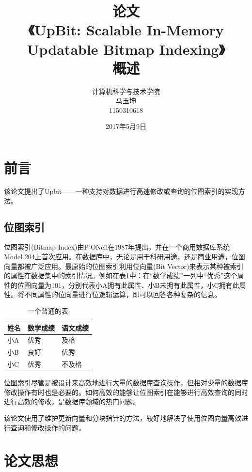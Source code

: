 \documentclass[11pt, a4paper]{article}
\begin{document}
\title{\bf 论文\\《UpBit: Scalable In-Memory Updatable Bitmap Indexing》\\概述}
  \author{计算机科学与技术学院\\马玉坤\\1150310618}
  \date{2017年5月9日}
  \maketitle

  \section{前言}
  该论文提出了Upbit——一种支持对数据进行高速修改或查询的位图索引的实现方法。

  \subsection{位图索引}
  位图索引(Bitmap Index)由P’ONeil在1987年提出，并在一个商用数据库系统Model 204上首次应用。在数据库中，无论是用于科研用途，还是商业用途，位图向量都被广泛应用。\cite{art3}最原始的位图索引利用位向量(Bit Vector)来表示某种被索引的属性在数据集中的索引情况。例如在表\ref{tb:table}中：在“数学成绩”一列中“优秀”这个属性的位图向量为101，分别代表小A拥有此属性、小B未拥有此属性，小C拥有此属性。将不同属性的位向量进行位逻辑运算，即可以回答各种复杂的信息。

  \begin{table}[]
    \centering
    \label{tb:table} \caption{一个普通的表}
    \begin{tabular}{|l|l|l|}
      \hline
      姓名 & 数学成绩 & 语文成绩 \\ \hline
      小A & 优秀   & 及格   \\ \hline
      小B & 良好   & 优秀   \\ \hline
      小C & 优秀   & 不及格 \\ \hline
    \end{tabular}
  \end{table}

  位图索引尽管是被设计来高效地进行大量的数据库查询操作，但相对少量的数据库修改操作有时也是必要的。如何高效的能够让位图索引在能够进行高效查询的同时进行高效的修改，是数据库领域的热门问题。

  该论文使用了维护更新向量和分块指针的方法，较好地解决了使用位图向量高效进行查询和修改操作的问题。

  \section{论文思想}
\end{document}
